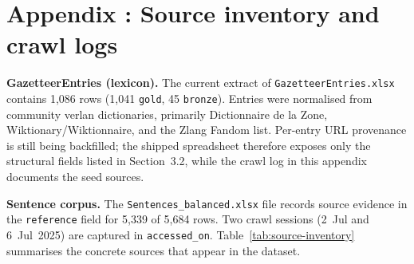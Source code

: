 \documentclass[12pt]{article}
\begin{document}
\clearpage
\section*{Appendix \thesection: Source inventory and crawl logs}

\noindent \textbf{GazetteerEntries (lexicon).} The current extract of \texttt{GazetteerEntries.xlsx} contains 1{,}086 rows (1{,}041 \texttt{gold}, 45 \texttt{bronze}). Entries were normalised from community verlan dictionaries, primarily Dictionnaire de la Zone, Wiktionary/Wiktionnaire, and the Zlang Fandom list. Per-entry URL provenance is still being backfilled; the shipped spreadsheet therefore exposes only the structural fields listed in Section~3.2, while the crawl log in this appendix documents the seed sources.

\noindent \textbf{Sentence corpus.} The \texttt{Sentences\_balanced.xlsx} file records source evidence in the \texttt{reference} field for 5{,}339 of 5{,}684 rows. Two crawl sessions (2~Jul and 6~Jul~2025) are captured in \texttt{accessed\_on}. Table~\ref{tab:source-inventory} summarises the concrete sources that appear in the dataset.
\end{document}
